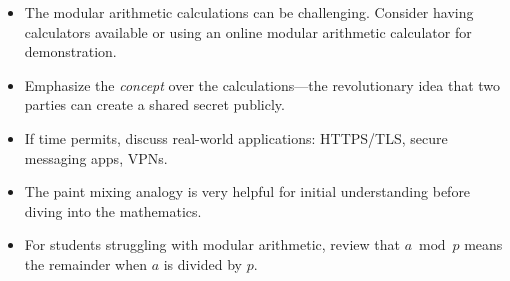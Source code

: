 \documentclass[11pt]{article}
\begin{document}
\begin{itemize}
    \item The modular arithmetic calculations can be challenging. Consider having calculators available or using an online modular arithmetic calculator for demonstration.
    \item Emphasize the \textit{concept} over the calculations—the revolutionary idea that two parties can create a shared secret publicly.
    \item If time permits, discuss real-world applications: HTTPS/TLS, secure messaging apps, VPNs.
    \item The paint mixing analogy is very helpful for initial understanding before diving into the mathematics.
    \item For students struggling with modular arithmetic, review that $a \bmod p$ means the remainder when $a$ is divided by $p$.
\end{itemize}
\end{document}
